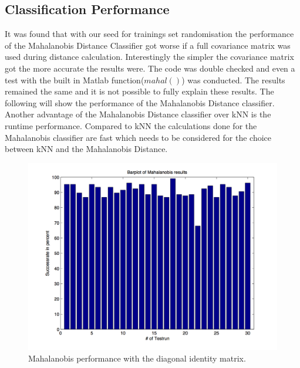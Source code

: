 \documentclass[subfigure,epsfig,fleqn,amssmb,float,caption,ausarbeitung]{scrartcl}
\begin{document}
\subsection{Classification Performance}
\label{sec:MahalanobisPerformance}

It was found that with our seed for trainings set randomisation the performance of the Mahalanobis Distance Classifier got worse if a full covariance matrix was used during distance calculation. Interestingly the simpler the covariance matrix got the more accurate the results were. The code was double checked and even a test with the built in Matlab function($mahal()$) was conducted. The results remained the same and it is not possible to fully explain these results. The following will show the performance of the Mahalanobis Distance classifier. 
Another advantage of the Mahalanobis Distance classifier over kNN is the runtime performance. Compared to kNN the calculations done for the Mahalanobis classifier are fast which needs to be considered for the choice between kNN and the Mahalanobis Distance. \\

\begin{figure}[ht]
	\centering
	\includegraphics[scale=0.75]{img/mahalanobis_results_diag_identity.jpg}
	\caption{Mahalanobis performance with the diagonal identity matrix.}
\end{figure}
\end{document}
